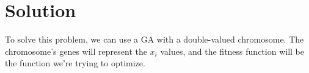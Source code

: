 \section{Solution}
\label{sec:fn_opt:sol}
  To solve this problem, we can use a GA with a double-valued chromosome.
  The chromosome's genes will represent the \(x_i\) values, and the fitness
  function will be the function we're trying to optimize.

  \blindtext